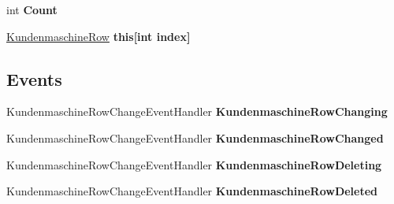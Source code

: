 \begin{DoxyCompactItemize}
\item 
int {\bfseries Count}\hypertarget{class_products_1_1_data_1_1ds_sage_1_1_kundenmaschine_data_table_a6579a236db73ba29c837543a9b81bce5}{}\label{class_products_1_1_data_1_1ds_sage_1_1_kundenmaschine_data_table_a6579a236db73ba29c837543a9b81bce5}

\item 
\hyperlink{class_products_1_1_data_1_1ds_sage_1_1_kundenmaschine_row}{Kundenmaschine\+Row} {\bfseries this\mbox{[}int index\mbox{]}}\hypertarget{class_products_1_1_data_1_1ds_sage_1_1_kundenmaschine_data_table_a90c312f4b10e061f1ab704ff9bd29fae}{}\label{class_products_1_1_data_1_1ds_sage_1_1_kundenmaschine_data_table_a90c312f4b10e061f1ab704ff9bd29fae}

\end{DoxyCompactItemize}
\subsection*{Events}
\begin{DoxyCompactItemize}
\item 
Kundenmaschine\+Row\+Change\+Event\+Handler {\bfseries Kundenmaschine\+Row\+Changing}\hypertarget{class_products_1_1_data_1_1ds_sage_1_1_kundenmaschine_data_table_ae0caeb83600919b79c1302430d14e045}{}\label{class_products_1_1_data_1_1ds_sage_1_1_kundenmaschine_data_table_ae0caeb83600919b79c1302430d14e045}

\item 
Kundenmaschine\+Row\+Change\+Event\+Handler {\bfseries Kundenmaschine\+Row\+Changed}\hypertarget{class_products_1_1_data_1_1ds_sage_1_1_kundenmaschine_data_table_ae3675005f3a9b85ed43615a5289fbacc}{}\label{class_products_1_1_data_1_1ds_sage_1_1_kundenmaschine_data_table_ae3675005f3a9b85ed43615a5289fbacc}

\item 
Kundenmaschine\+Row\+Change\+Event\+Handler {\bfseries Kundenmaschine\+Row\+Deleting}\hypertarget{class_products_1_1_data_1_1ds_sage_1_1_kundenmaschine_data_table_a7efd1a119655631302ea934dffc3c4e0}{}\label{class_products_1_1_data_1_1ds_sage_1_1_kundenmaschine_data_table_a7efd1a119655631302ea934dffc3c4e0}

\item 
Kundenmaschine\+Row\+Change\+Event\+Handler {\bfseries Kundenmaschine\+Row\+Deleted}\hypertarget{class_products_1_1_data_1_1ds_sage_1_1_kundenmaschine_data_table_a12817a195ac979f189e167365240f627}{}\label{class_products_1_1_data_1_1ds_sage_1_1_kundenmaschine_data_table_a12817a195ac979f189e167365240f627}

\end{DoxyCompactItemize}


